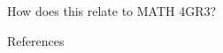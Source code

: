 \documentclass[final]{beamer}
\newlength{\sepwidth}
\newlength{\colwidth}
\newcommand{\separatorcolumn}{\begin{column}{\sepwidth}\end{column}}
\begin{document}
\begin{frame}[t]
\begin{columns}[t]
\begin{column}{\colwidth}
\begin{alertblock}{How does this relate to MATH 4GR3?}
  \end{alertblock}

  \begin{block}{References}

    \nocite{*}
    \footnotesize{}

  \end{block}

\end{column}

\separatorcolumn
\end{columns}
\end{frame}
\end{document}
